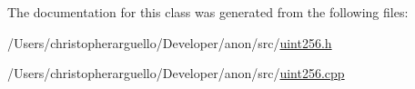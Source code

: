 The documentation for this class was generated from the following files\+:\begin{DoxyCompactItemize}
\item 
/\+Users/christopherarguello/\+Developer/anon/src/\mbox{\hyperlink{uint256_8h}{uint256.\+h}}\item 
/\+Users/christopherarguello/\+Developer/anon/src/\mbox{\hyperlink{uint256_8cpp}{uint256.\+cpp}}\end{DoxyCompactItemize}
